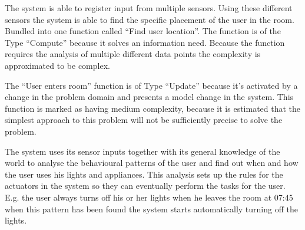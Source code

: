 The system is able to register input from multiple sensors. Using these different sensors the system is able to find the specific placement of the user in the room. Bundled into one function called \enquote{Find user location}. The function is of the Type \enquote{Compute} because it solves an information need. Because the function requires the analysis of multiple different data points the complexity is approximated to be complex.

The \enquote{User enters room} function is of Type \enquote{Update} because it's activated by a change in the problem domain and presents a model change in the system. This function is marked as having medium complexity, because it is estimated that the simplest approach to this problem will not be sufficiently precise to solve the problem. 

The system uses its sensor inputs together with its general knowledge of the world to analyse the behavioural patterns of the user and find out when and how the user uses his lights and appliances. This analysis sets up the rules for the actuators in the system so they can eventually perform the tasks for the user. E.g. the user always turns off his or her lights when he leaves the room at 07:45 when this pattern has been found the system starts automatically turning off the lights.
